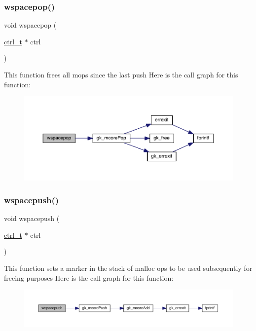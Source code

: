 \subsubsection{\texorpdfstring{wspacepop()}{wspacepop()}}
{\footnotesize\ttfamily void wspacepop (\begin{DoxyParamCaption}\item[{\hyperlink{a00742}{ctrl\+\_\+t} $\ast$}]{ctrl }\end{DoxyParamCaption})}

This function frees all mops since the last push Here is the call graph for this function\+:\nopagebreak
\begin{figure}[H]
\begin{center}
\leavevmode
\includegraphics[width=350pt]{a00945_ad26c08175b8b18d7dfb86f2f8d91b09e_cgraph}
\end{center}
\end{figure}
\mbox{\label{a00945_a90d838f5af71d196b117d443432e4646}} 
\subsubsection{\texorpdfstring{wspacepush()}{wspacepush()}}
{\footnotesize\ttfamily void wspacepush (\begin{DoxyParamCaption}\item[{\hyperlink{a00742}{ctrl\+\_\+t} $\ast$}]{ctrl }\end{DoxyParamCaption})}

This function sets a marker in the stack of malloc ops to be used subsequently for freeing purposes Here is the call graph for this function\+:\nopagebreak
\begin{figure}[H]
\begin{center}
\leavevmode
\includegraphics[width=350pt]{a00945_a90d838f5af71d196b117d443432e4646_cgraph}
\end{center}
\end{figure}
